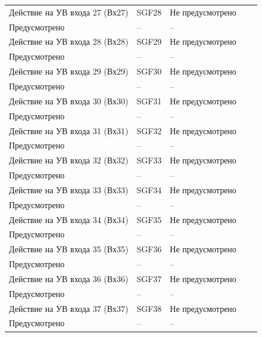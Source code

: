\begin{longtable}{|>{\centering\arraybackslash}m{5.3cm}|>{\centering\arraybackslash}m{3.3cm}|>{\centering\arraybackslash}m{4.2cm}|>{\centering\arraybackslash}m{1.8cm}|>{\centering\arraybackslash}m{1cm}|}
\hline
\centering Действие на УВ входа 27 (Вх27)  & \centering SGF28 & \centering Не предусмотрено \\ Предусмотрено & \centering -- & \centering \arraybackslash -- \\
\hline
\centering Действие на УВ входа 28 (Вх28)  & \centering SGF29 & \centering Не предусмотрено \\ Предусмотрено & \centering -- & \centering \arraybackslash -- \\
\hline
\centering Действие на УВ входа 29 (Вх29)  & \centering SGF30 & \centering Не предусмотрено \\ Предусмотрено & \centering -- & \centering \arraybackslash -- \\
\hline
\centering Действие на УВ входа 30 (Вх30)  & \centering SGF31 & \centering Не предусмотрено \\ Предусмотрено & \centering -- & \centering \arraybackslash -- \\
\hline
\centering Действие на УВ входа 31 (Вх31)  & \centering SGF32 & \centering Не предусмотрено \\ Предусмотрено & \centering -- & \centering \arraybackslash -- \\
\hline
\centering Действие на УВ входа 32 (Вх32)  & \centering SGF33 & \centering Не предусмотрено \\ Предусмотрено & \centering -- & \centering \arraybackslash -- \\
\hline
\centering Действие на УВ входа 33 (Вх33)  & \centering SGF34 & \centering Не предусмотрено \\ Предусмотрено & \centering -- & \centering \arraybackslash -- \\
\hline
\centering Действие на УВ входа 34 (Вх34)  & \centering SGF35 & \centering Не предусмотрено \\ Предусмотрено & \centering -- & \centering \arraybackslash -- \\
\hline
\centering Действие на УВ входа 35 (Вх35)  & \centering SGF36 & \centering Не предусмотрено \\ Предусмотрено & \centering -- & \centering \arraybackslash -- \\
\hline
\centering Действие на УВ входа 36 (Вх36)  & \centering SGF37 & \centering Не предусмотрено \\ Предусмотрено & \centering -- & \centering \arraybackslash -- \\
\hline
\centering Действие на УВ входа 37 (Вх37)  & \centering SGF38 & \centering Не предусмотрено \\ Предусмотрено & \centering -- & \centering \arraybackslash -- \\

\end{longtable}
